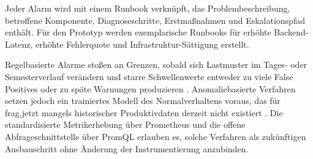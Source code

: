 Jeder Alarm wird mit einem Runbook verknüpft, das Problembeschreibung, betroffene Komponente, Diagnoseschritte, Erstmaßnahmen und Eskalationspfad enthält. Für den Prototyp werden exemplarische Runbooks für erhöhte Backend-Latenz, erhöhte Fehlerquote und Infrastruktur-Sättigung erstellt.
 
\medskip
 
Regelbasierte Alarme stoßen an Grenzen, sobald sich Lastmuster im Tages- oder Semesterverlauf verändern und starre Schwellenwerte entweder zu viele False Positives oder zu späte Warnungen produzieren \parencite[S.~173]{vinnakota2025creating}. Anomaliebasierte Verfahren setzen jedoch ein trainiertes Modell des Normalverhaltens voraus, das für frag.jetzt mangels historischer Produktivdaten derzeit nicht existiert \parencite[S.~5--6]{soldani2022anomaly}. Die standardisierte Metrikerhebung über Prometheus und die offene Abfrageschnittstelle über PromQL erlauben es, solche Verfahren als zukünftigen Ausbauschritt ohne Änderung der Instrumentierung anzubinden.
 